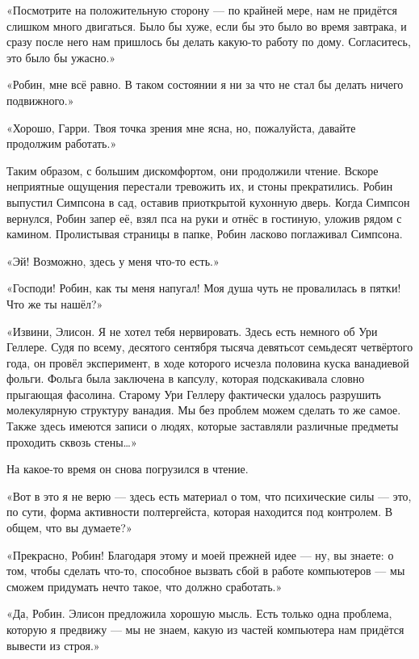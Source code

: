 \documentclass[a4paper,12pt]{book}
\begin{document}
\par
«Посмотрите на положительную сторону — по крайней мере, нам не придётся слишком много двигаться. Было бы хуже, если бы это было во время завтрака, и сразу после него нам пришлось бы делать какую-то работу по дому. Согласитесь, это было бы ужасно.»
\par
«Робин, мне всё равно. В таком состоянии я ни за что не стал бы делать ничего подвижного.»
\par
«Хорошо, Гарри. Твоя точка зрения мне ясна, но, пожалуйста, давайте продолжим работать.»\\
\par
Таким образом, с большим дискомфортом, они продолжили чтение. Вскоре неприятные ощущения перестали тревожить их, и стоны прекратились. Робин выпустил Симпсона в сад, оставив приоткрытой кухонную дверь. Когда Симпсон вернулся, Робин запер её, взял пса на руки и отнёс в гостиную, уложив рядом с камином. Пролистывая страницы в папке, Робин ласково поглаживал Симпсона.
\par
«Эй! Возможно, здесь у меня что-то есть.»
\par
«Господи! Робин, как ты меня напугал! Моя душа чуть не провалилась в пятки! Что же ты нашёл?»
\par
«Извини, Элисон. Я не хотел тебя нервировать. Здесь есть немного об Ури Геллере. Судя по всему, десятого сентября тысяча девятьсот семьдесят четвёртого года, он провёл эксперимент, в ходе которого исчезла половина куска ванадиевой фольги. Фольга была заключена в капсулу, которая подскакивала словно прыгающая фасолина. Старому Ури Геллеру фактически удалось разрушить молекулярную структуру ванадия. Мы без проблем можем сделать то же самое. Также здесь имеются записи о людях, которые заставляли различные предметы проходить сквозь стены…»
\par
На какое-то время он снова погрузился в чтение.
\par
«Вот в это я не верю — здесь есть материал о том, что психические силы — это, по сути, форма активности полтергейста, которая находится под контролем. В общем, что вы думаете?»
\par
«Прекрасно, Робин! Благодаря этому и моей прежней идее — ну, вы знаете: о том, чтобы сделать что-то, способное вызвать сбой в работе компьютеров — мы сможем придумать нечто такое, что должно сработать.»
\par
«Да, Робин. Элисон предложила хорошую мысль. Есть только одна проблема, которую я предвижу — мы не знаем, какую из частей компьютера нам придётся вывести из строя.»
\end{document}

